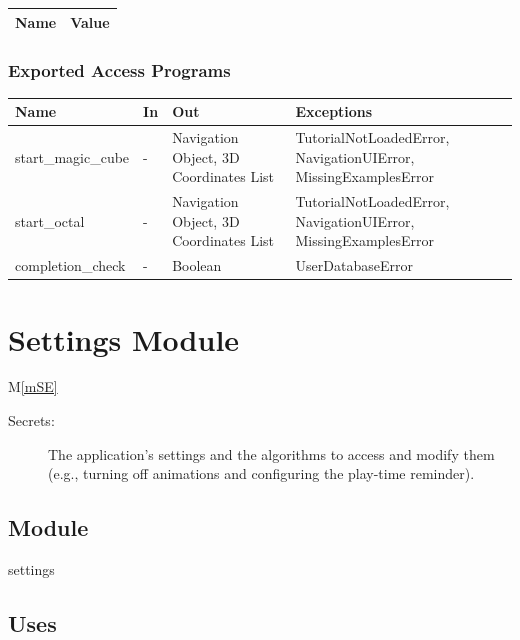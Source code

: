\documentclass[12pt, titlepage]{article}
\newcommand{\mref}[1]{M\ref{#1}}
\begin{document}
\begin{center}
\begin{tabular}{p{10cm} p{4cm}}
\hline
\textbf{Name} & \textbf{Value}\\
\hline


\hline
\end{tabular}
\end{center}

\subsubsection{Exported Access Programs}

\begin{center}
\begin{tabular}{p{4cm} p{4cm} p{4cm} p{4cm}}
\hline
\textbf{Name} & \textbf{In} & \textbf{Out} & \textbf{Exceptions} \\
\hline
start\_magic\_cube & - & Navigation Object, 3D Coordinates List & TutorialNotLoadedError, NavigationUIError, MissingExamplesError \\
start\_octal & - & Navigation Object, 3D Coordinates List & TutorialNotLoadedError, NavigationUIError, MissingExamplesError \\
completion\_check & - & Boolean & UserDatabaseError \\
\hline
\end{tabular}
\end{center}

\newpage

\section{Settings Module} \mref{mSE} 


\begin{description}
\item[Secrets:] The application's settings and the algorithms to access and modify them (e.g., turning off animations and configuring the play-time reminder).
\end{description}

\subsection{Module}

settings

\subsection{Uses}
\end{document}
